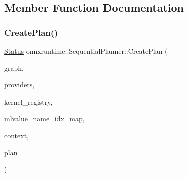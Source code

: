 \subsection{Member Function Documentation}
\mbox{\label{classonnxruntime_1_1SequentialPlanner_acd289ccfd038947aff6312fd8ab53a71}} 
\subsubsection{\texorpdfstring{Create\+Plan()}{CreatePlan()}\hspace{0.1cm}{\footnotesize\ttfamily [1/2]}}
{\footnotesize\ttfamily \mbox{\hyperlink{classonnxruntime_1_1common_1_1Status}{Status}} onnxruntime\+::\+Sequential\+Planner\+::\+Create\+Plan (\begin{DoxyParamCaption}\item[{const \mbox{\hyperlink{classonnxruntime_1_1Graph}{onnxruntime\+::\+Graph}} \&}]{graph,  }\item[{const \mbox{\hyperlink{classonnxruntime_1_1ExecutionProviders}{Execution\+Providers}} \&}]{providers,  }\item[{const \mbox{\hyperlink{classonnxruntime_1_1KernelRegistryManager}{Kernel\+Registry\+Manager}} \&}]{kernel\+\_\+registry,  }\item[{const \mbox{\hyperlink{classonnxruntime_1_1MLValueNameIdxMap}{M\+L\+Value\+Name\+Idx\+Map}} \&}]{mlvalue\+\_\+name\+\_\+idx\+\_\+map,  }\item[{const \mbox{\hyperlink{classonnxruntime_1_1ISequentialPlannerContext}{I\+Sequential\+Planner\+Context}} \&}]{context,  }\item[{std\+::unique\+\_\+ptr$<$ \mbox{\hyperlink{structonnxruntime_1_1SequentialExecutionPlan}{Sequential\+Execution\+Plan}} $>$ \&}]{plan }\end{DoxyParamCaption})\hspace{0.3cm}{\ttfamily [static]}}

\mbox{\label{classonnxruntime_1_1SequentialPlanner_af1a4a3cddff791ac7677d7c70ea7e64d}} 
